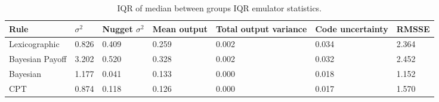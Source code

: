 \begin{table}[h!]
\center
\begin{tabular} {|l | l | l | l | l | l |}
\hline
Rule & \(\sigma^2\) & Nugget \(\sigma^2\) & Mean output & Total output variance & Code uncertainty & RMSSE \\ \hline
Lexicographic & 0.826 & 0.409 & 0.259 & 0.002 & 0.034 & 2.364 \\ \hline
Bayesian Payoff & 3.202 & 0.520 & 0.328 & 0.002 & 0.032 & 2.452 \\ \hline
Bayesian & 1.177 & 0.041 & 0.133 & 0.000 & 0.018 & 1.152 \\ \hline
\ac{CPT} & 0.874 & 0.118 & 0.126 & 0.000 & 0.017 & 1.570 \\ \hline
\end{tabular}
\caption[Table caption text]{IQR of median between groups IQR emulator statistics. \label{tab:sa_emulator_iqr_iqr}}
\end{table}